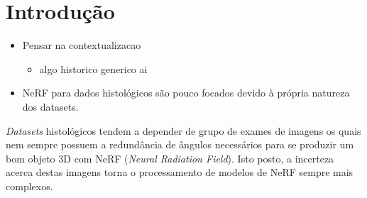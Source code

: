 \section{Introdução}

\begin{itemize}
  \item Pensar na contextualizacao
    \begin{itemize}
      \item algo historico generico ai
    \end{itemize}
  \item NeRF para dados histológicos são pouco focados devido à própria natureza dos datasets.
\end{itemize}

\textit{Datasets} histológicos tendem a depender de grupo de exames de imagens os quais nem sempre possuem a redundância de ângulos necessários para se produzir um bom objeto 3D com NeRF (\textit{Neural Radiation Field})\cite{mildenhall2020nerfrepresentingscenesneural}. Isto posto, a incerteza acerca destas imagens torna o processamento de modelos de NeRF sempre mais complexos.

